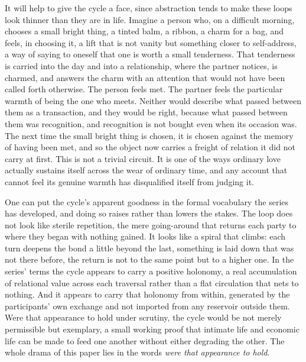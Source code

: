 \documentclass[11pt,a4paper]{article}
\begin{document}
It will help to give the cycle a face, since abstraction tends to make these loops look thinner than they are in life. Imagine a person who, on a difficult morning, chooses a small bright thing, a tinted balm, a ribbon, a charm for a bag, and feels, in choosing it, a lift that is not vanity but something closer to self-address, a way of saying to oneself that one is worth a small tenderness. That tenderness is carried into the day and into a relationship, where the partner notices, is charmed, and answers the charm with an attention that would not have been called forth otherwise. The person feels met. The partner feels the particular warmth of being the one who meets. Neither would describe what passed between them as a transaction, and they would be right, because what passed between them was recognition, and recognition is not bought even when its occasion was. The next time the small bright thing is chosen, it is chosen against the memory of having been met, and so the object now carries a freight of relation it did not carry at first. This is not a trivial circuit. It is one of the ways ordinary love actually sustains itself across the wear of ordinary time, and any account that cannot feel its genuine warmth has disqualified itself from judging it.

One can put the cycle's apparent goodness in the formal vocabulary the series has developed, and doing so raises rather than lowers the stakes. The loop does not look like sterile repetition, the mere going-around that returns each party to where they began with nothing gained. It looks like a spiral that climbs: each turn deepens the bond a little beyond the last, something is laid down that was not there before, the return is not to the same point but to a higher one. In the series' terms the cycle appears to carry a positive holonomy, a real accumulation of relational value across each traversal rather than a flat circulation that nets to nothing. And it appears to carry that holonomy from within, generated by the participants' own exchange and not imported from any reservoir outside them. Were that appearance to hold under scrutiny, the cycle would be not merely permissible but exemplary, a small working proof that intimate life and economic life can be made to feed one another without either degrading the other. The whole drama of this paper lies in the words \textit{were that appearance to hold}.
\end{document}
